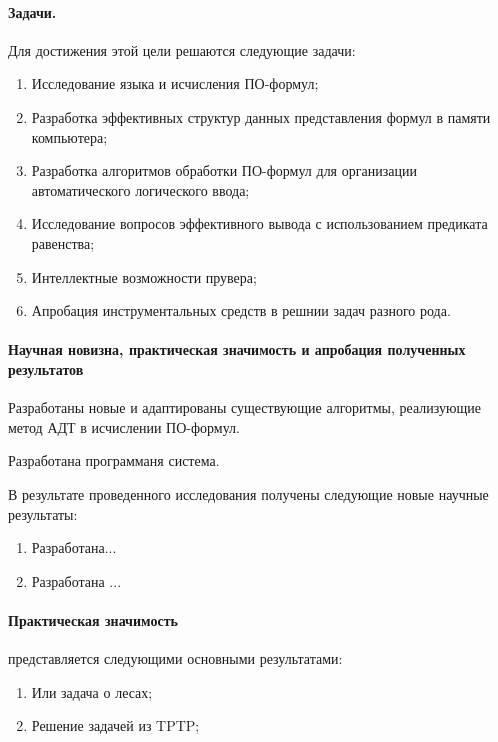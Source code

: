 \paragraph{Задачи.} Для достижения этой цели решаются следующие задачи:
\begin{enumerate}
\item Исследование языка и исчисления ПО-формул;
\item Разработка эффективных структур данных представления формул в памяти компьютера;
\item Разработка алгоритмов обработки ПО-формул для организации автоматического логического ввода;
\item Исследование вопросов эффективного вывода с использованием предиката равенства;
\item Интеллектные возможности прувера;
\item Апробация инструментальных средств в решнии задач разного рода.
\end{enumerate}

\paragraph{Научная новизна, практическая значимость и апробация полученных результатов}
Разработаны новые и адаптированы существующие алгоритмы, реализующие метод АДТ в исчислении ПО-формул.

Разработана программаня система.

В результате проведенного исследования получены следующие новые научные результаты:
\begin{enumerate}
\item Разработана... 
\item Разработана ...
\end{enumerate}
\paragraph{Практическая значимость}\hspace{-1em} представляется следующими основными результатами:
\begin{enumerate}
\item Или задача о лесах;
\item Решение задачей из TPTP;
\end{enumerate}

